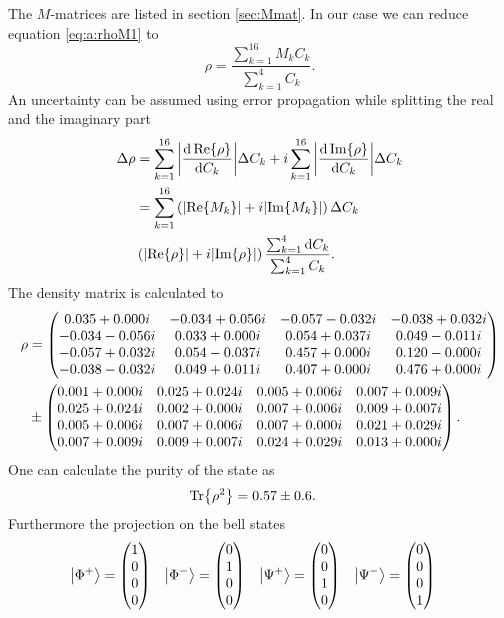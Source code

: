 The $M$-matrices are listed in section \vref{sec:Mmat}.
In our case we can reduce equation \eqref{eq:a:rhoM1} to
\begin{equation}
\rho
=\frac{\sum_{k=1}^{16}M_kC_k}{\sum_{k=1}^{4}C_k}.
\label{eq:a:rhoM2}
\end{equation}
An uncertainty can be assumed using error propagation while splitting the real and the imaginary part
\begin{subequations}
\label{eq:a:drho}
\begin{align}
\Delta \rho
    &=\sum_{k=1}^{16}\abs{\frac{\dd\Re{\rho}}{\dd C_k}}\Delta C_k+i\sum_{k=1}^{16}\abs{\frac{\dd\Im{\rho}}{\dd C_k}}\Delta C_k
    \label{eq:a:drho:1}\\
    &=\sum_{k=1}^{16}\left(\abs{\Re{M_k}}+i\abs{\Im{M_k}}\right)\Delta C_k
    \nonumber\\
    &\left(\abs{\Re{\rho}}+i\abs{\Im{\rho}}\right)\frac{\sum_{k=1}^4\dd C_k}{\sum_{k=1}^4C_k}.
    \label{eq:a:drho:2}
\end{align}
\end{subequations}
The density matrix is calculated to
\begin{align*}
\rho
    &=\begin{pmatrix} 0.035+0.000i &-0.034+0.056i &-0.057-0.032i &-0.038+0.032i\\ -0.034-0.056i &0.033+0.000i &0.054+0.037i &0.049-0.011i\\ -0.057+0.032i &0.054-0.037i &0.457+0.000i &0.120-0.000i\\ -0.038-0.032i &0.049+0.011i &0.407+0.000i &0.476+0.000i \end{pmatrix}\\
    &\pm \begin{pmatrix} 0.001+0.000i &0.025+0.024i &0.005+0.006i &0.007+0.009i\\ 0.025+0.024i &0.002+0.000i &0.007+0.006i &0.009+0.007i\\ 0.005+0.006i &0.007+0.006i &0.007+0.000i &0.021+0.029i\\ 0.007+0.009i &0.009+0.007i &0.024+0.029i &0.013+0.000i \end{pmatrix} .
\end{align*}
One can calculate the purity of the state as
\begin{align*}
\Tr{\rho^2}
    &=0.57\pm 0.6.
\end{align*}
Furthermore the projection on the bell states 
\begin{align}
\ket{\Phi^{+}}
    &=\begin{pmatrix}1\\0\\0\\0\end{pmatrix}
    &\ket{\Phi^{-}}
    &=\begin{pmatrix}0\\1\\0\\0\end{pmatrix}
    &\ket{\Psi^{+}}
    &=\begin{pmatrix}0\\0\\1\\0\end{pmatrix}
    &\ket{\Psi^{-}}
    &=\begin{pmatrix}0\\0\\0\\1\end{pmatrix}
    \label{eq:a:bell_basis}
\end{align}
